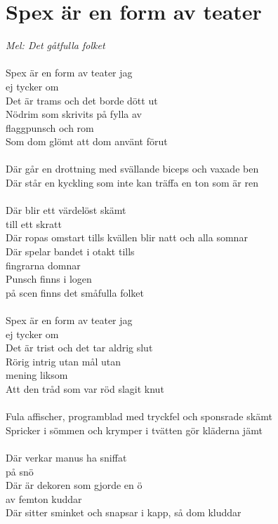 \documentclass[a5paper,15pt]{article}
\begin{document}
\section{Spex är en form av teater}
\emph{Mel: Det gåtfulla folket}\\
\\
Spex är en form av teater jag\\
ej tycker om\\ 
Det är trams och det borde dött ut\\ 
Nödrim som skrivits på fylla av\\ 
flaggpunsch och rom \\
Som dom glömt att dom använt förut\\
\\
Där går en drottning med svällande biceps och vaxade ben\\ 
Där står en kyckling som inte kan träffa en ton som är ren\\
\\
Där blir ett värdelöst skämt \\till ett skratt\\ 
Där ropas omstart tills kvällen blir natt och alla somnar \\
Där spelar bandet i otakt tills \\fingrarna domnar\\ 
Punsch finns i logen \\
på scen finns det småfulla folket\\
\\
Spex är en form av teater jag \\ej tycker om\\ 
Det är trist och det tar aldrig slut\\ 
Rörig intrig utan mål utan \\mening liksom\\ 
Att den tråd som var röd slagit knut\\
\\
Fula affischer, programblad med tryckfel och sponsrade skämt \\
Spricker i sömmen och krymper i tvätten gör kläderna jämt\\
\\
Där verkar manus ha sniffat \\på snö\\ 
Där är dekoren som gjorde en ö\\ 
av femton kuddar \\
Där sitter sminket och snapsar i kapp, så dom kluddar \\
\end{document}
